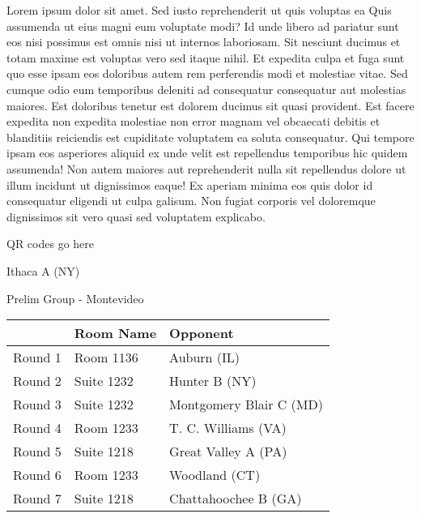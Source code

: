 \documentclass{article}%
\begin{document}
\vspace*{8pt}%
\linebreak%
\newline%
\newline%
Lorem ipsum dolor sit amet. Sed iusto reprehenderit ut quis voluptas ea Quis assumenda ut eius magni eum voluptate modi? Id unde libero ad pariatur sunt eos nisi possimus est omnis nisi ut internos laboriosam. Sit nesciunt ducimus et totam maxime est voluptas vero sed itaque nihil. Et expedita culpa et fuga sunt quo esse ipsam eos doloribus autem rem perferendis modi et molestiae vitae.\newline%
\newline%
Sed cumque odio eum temporibus deleniti ad consequatur consequatur aut molestias maiores. Est doloribus tenetur est dolorem ducimus sit quasi provident. Est facere expedita non expedita molestiae non error magnam vel obcaecati debitis et blanditiis reiciendis est cupiditate voluptatem ea soluta consequatur. Qui tempore ipsam eos asperiores aliquid ex unde velit est repellendus temporibus hic quidem assumenda!\newline%
\newline%
Non autem maiores aut reprehenderit nulla sit repellendus dolore ut illum incidunt ut dignissimos eaque! Ex aperiam minima eos quis dolor id consequatur eligendi ut culpa galisum. Non fugiat corporis vel doloremque dignissimos sit vero quasi sed voluptatem explicabo.\newline%
\newline%
%
\vspace*{30pt}%
\begin{center}%
\begin{Huge}%
QR codes go here%
\end{Huge}%
\end{center}%
\newpage%
%
\begin{center}%
\begin{Huge}%
Ithaca A (NY)%
\end{Huge}%
\vspace*{8pt}%
\linebreak%
\begin{Large}%
Prelim Group {-} Montevideo%
\end{Large}%
\end{center}%
\begin{tabularx}{\textwidth}{|c|Y|Y|}%
\hline%
&Room Name&Opponent\\%
\hline%
Round 1&Room 1136&Auburn (IL)\\%
Round 2&Suite 1232&Hunter B (NY)\\%
Round 3&Suite 1232&Montgomery Blair C (MD)\\%
Round 4&Room 1233&T. C. Williams (VA)\\%
Round 5&Suite 1218&Great Valley A (PA)\\%
Round 6&Room 1233&Woodland (CT)\\%
Round 7&Suite 1218&Chattahoochee B (GA)\\%
\hline%
\end{tabularx}%
\end{document}

